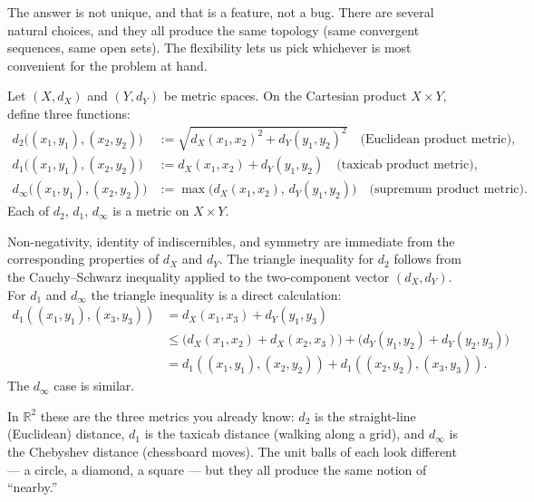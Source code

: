The answer is not unique, and that is a feature, not a bug.
There are several natural choices, and they all produce the same
topology (same convergent sequences, same open sets).
The flexibility lets us pick whichever is most convenient for
the problem at hand.

\begin{tcolorbox}[colback=propbox, colframe=propborder, arc=2pt,
  left=6pt, right=6pt, top=4pt, bottom=4pt,
  title={\small\textbf{Definition (Product Metrics)}},
  fonttitle=\small\bfseries]
\begin{definition}
\label{def:product-metrics}
Let $(X, d_X)$ and $(Y, d_Y)$ be metric spaces.
On the Cartesian product $X \times Y$, define three functions:
\begin{align*}
d_2\bigl((x_1,y_1),(x_2,y_2)\bigr)
  &:= \sqrt{d_X(x_1,x_2)^2 + d_Y(y_1,y_2)^2}
  \quad\text{(Euclidean product metric)},\\[4pt]
d_1\bigl((x_1,y_1),(x_2,y_2)\bigr)
  &:= d_X(x_1,x_2) + d_Y(y_1,y_2)
  \quad\text{(taxicab product metric)},\\[4pt]
d_\infty\bigl((x_1,y_1),(x_2,y_2)\bigr)
  &:= \max\!\bigl(d_X(x_1,x_2),\, d_Y(y_1,y_2)\bigr)
  \quad\text{(supremum product metric)}.
\end{align*}
Each of $d_2$, $d_1$, $d_\infty$ is a metric on $X \times Y$.
\end{definition}
\end{tcolorbox}

\begin{remark*}
Non-negativity, identity of indiscernibles, and symmetry are immediate
from the corresponding properties of $d_X$ and $d_Y$.
The triangle inequality for $d_2$ follows from the Cauchy--Schwarz
inequality applied to the two-component vector $(d_X, d_Y)$.
For $d_1$ and $d_\infty$ the triangle inequality is a direct calculation:
\begin{align*}
d_1((x_1,y_1),(x_3,y_3))
&= d_X(x_1,x_3) + d_Y(y_1,y_3) \\
&\le \bigl(d_X(x_1,x_2) + d_X(x_2,x_3)\bigr) +
     \bigl(d_Y(y_1,y_2) + d_Y(y_2,y_3)\bigr) \\
&= d_1((x_1,y_1),(x_2,y_2)) + d_1((x_2,y_2),(x_3,y_3)).
\end{align*}
The $d_\infty$ case is similar.
\end{remark*}

\begin{remark*}
In $\mathbb{R}^2$ these are the three metrics you already know:
$d_2$ is the straight-line (Euclidean) distance,
$d_1$ is the taxicab distance (walking along a grid),
and $d_\infty$ is the Chebyshev distance (chessboard moves).
The unit balls of each look different --- a circle, a diamond, a square ---
but they all produce the same notion of ``nearby.''
\end{remark*}

